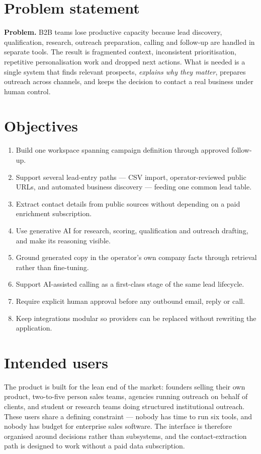 \documentclass[11pt,a4paper]{report}
\begin{document}
\section{Problem statement}
\begin{successbox}
\textbf{Problem.} B2B teams lose productive capacity because lead discovery, qualification, research, outreach preparation, calling and follow-up are handled in separate tools. The result is fragmented context, inconsistent prioritisation, repetitive personalisation work and dropped next actions. What is needed is a single system that finds relevant prospects, \emph{explains why they matter}, prepares outreach across channels, and keeps the decision to contact a real business under human control.
\end{successbox}

\section{Objectives}
\begin{enumerate}[leftmargin=1.4em,itemsep=2pt]
  \item Build one workspace spanning campaign definition through approved follow-up.
  \item Support several lead-entry paths --- CSV import, operator-reviewed public URLs, and automated business discovery --- feeding one common lead table.
  \item Extract contact details from public sources without depending on a paid enrichment subscription.
  \item Use generative AI for research, scoring, qualification and outreach drafting, and make its reasoning visible.
  \item Ground generated copy in the operator's own company facts through retrieval rather than fine-tuning.
  \item Support AI-assisted calling as a first-class stage of the same lead lifecycle.
  \item Require explicit human approval before any outbound email, reply or call.
  \item Keep integrations modular so providers can be replaced without rewriting the application.
\end{enumerate}

\section{Intended users}
The product is built for the lean end of the market: founders selling their own product, two-to-five person sales teams, agencies running outreach on behalf of clients, and student or research teams doing structured institutional outreach. These users share a defining constraint --- nobody has time to run six tools, and nobody has budget for enterprise sales software. The interface is therefore organised around decisions rather than subsystems, and the contact-extraction path is designed to work without a paid data subscription.
\end{document}
